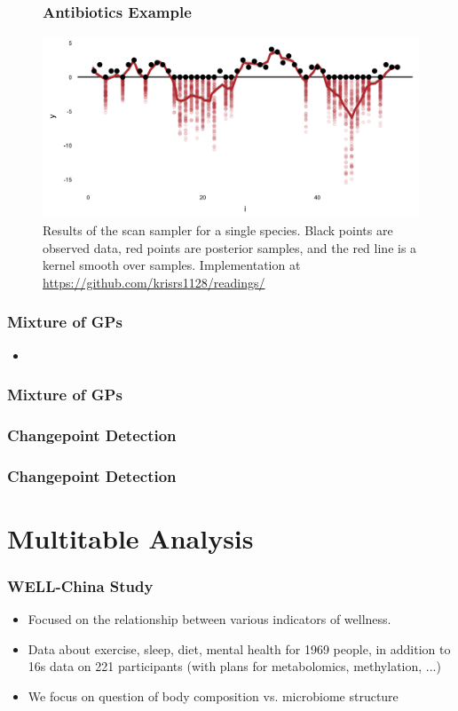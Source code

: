 \documentclass{beamer}
\begin{document}
\begin{figure}
  \frametitle{Antibiotics Example}
  \centering
  \includegraphics[width=\textwidth]{figure/abt_scan}
  \caption{Results of the scan sampler for a single species. Black points are
    observed data, red points are posterior samples, and the red line is a
    kernel smooth over samples. Implementation at
    \url{https://github.com/krisrs1128/readings/} \label{fig:abt_scan}
  }
\end{figure}

\begin{frame}
  \frametitle{Mixture of GPs}
 \begin{itemize}
 \item 
 \end{itemize} 
\end{frame}

\begin{frame}
  \frametitle{Mixture of GPs}
\end{frame}

\begin{frame}
  \frametitle{Changepoint Detection}
\end{frame}

\begin{frame}
  \frametitle{Changepoint Detection}
\end{frame}

\section{Multitable Analysis}
\label{sec:multitable analysis}

\begin{frame}
  \frametitle{WELL-China Study}
  \begin{itemize}
  \item Focused on the relationship between various indicators of wellness.
  \item Data about exercise, sleep, diet, mental health for 1969 people, in
    addition to 16s data on 221 participants (with plans for metabolomics,
    methylation, ...)
  \item We focus on question of body composition vs. microbiome structure
  \end{itemize}
\end{frame}
\end{document}
